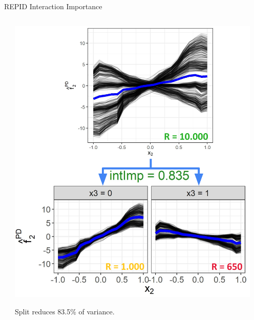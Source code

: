 \documentclass[11pt,compress,t,notes=noshow, aspectratio=169, xcolor=table,dvipsnames]{beamer}
\begin{document}
\begin{frame}{REPID Interaction Importance}
\begin{columns}[T, totalwidth=\textwidth]
\begin{column}{0.59\textwidth}
\begin{center}
\end{center}
    \end{column}
\pause
    \begin{column}{0.4\textwidth}
 \centering
\includegraphics[width = 0.95\textwidth]{figure/sim1_fake.png}

Split reduces 83.5\% of variance.
    \end{column}
\end{columns}

\end{frame}
\end{document}
